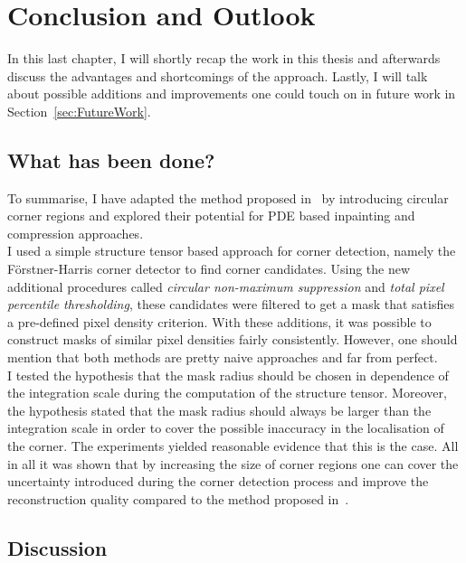 \chapter{Conclusion and Outlook}\label{ch:Conclusion}

In this last chapter, I will shortly recap the work in this thesis and afterwards discuss the
advantages and shortcomings of the approach.
Lastly, I will talk about possible additions and improvements one could touch on in future work in Section~\ref{sec:FutureWork}.

\section{What has been done?}

To summarise, I have adapted the method proposed in~\cite{zimmer07} by introducing circular corner
regions and explored their potential for PDE based inpainting and compression approaches.\\
I used a simple structure tensor based approach for corner detection, namely the Förstner-Harris
corner detector to find corner candidates. Using the new additional procedures called
\textit{circular non-maximum suppression} and \textit{total pixel percentile thresholding}, these
candidates were filtered to get a mask that satisfies a pre-defined pixel density criterion. With
these additions, it was possible to construct masks of similar pixel densities fairly consistently.
However, one should mention that both methods are pretty naive approaches and far from perfect.\\
I tested the hypothesis that the mask radius should be chosen in dependence of the integration
scale during the computation of the structure tensor. Moreover, the hypothesis stated that the mask
radius should always be larger than the integration scale in order to cover the possible inaccuracy
in the localisation of the corner. The experiments yielded reasonable evidence that this is the
case. 
All in all it was shown that by increasing the size of corner regions one can cover the uncertainty
introduced during the corner detection process and improve the reconstruction quality compared to
the method proposed in~\cite{zimmer07}.

\section{Discussion}

